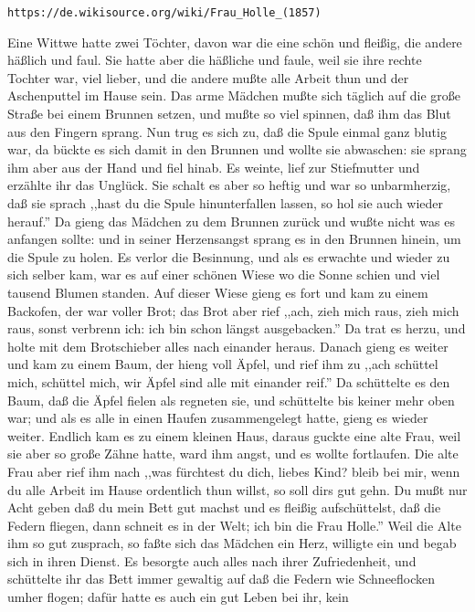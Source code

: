 \documentclass[10pt,a4paper]{article}
\begin{document}
\verb+https://de.wikisource.org/wiki/Frau_Holle_(1857)+

\vskip 4pt
Eine Wittwe hatte zwei Töchter, davon war die eine schön und fleißig, die andere
häßlich und faul. Sie hatte aber die häßliche und faule, weil sie ihre rechte
Tochter war, viel lieber, und die andere mußte alle Arbeit thun und der
Aschenputtel im Hause sein. Das arme Mädchen mußte sich täglich auf die große
Straße bei einem Brunnen setzen, und mußte so viel spinnen, daß ihm das Blut aus
den Fingern sprang. Nun trug es sich zu, daß die Spule einmal ganz blutig war,
da bückte es sich damit in den Brunnen und wollte sie abwaschen: sie sprang ihm
aber aus der Hand und fiel hinab. Es weinte, lief zur Stiefmutter und erzählte
ihr das Unglück. Sie schalt es aber so heftig und war so unbarmherzig, daß sie
sprach ,,hast du die Spule hinunterfallen lassen, so hol sie auch wieder herauf.''
Da gieng das Mädchen zu dem Brunnen zurück und wußte nicht was es anfangen
sollte: und in seiner Herzensangst sprang es in den Brunnen hinein, um die Spule
zu holen. Es verlor die Besinnung, und als es erwachte und wieder zu sich selber
kam, war es auf einer schönen Wiese wo die Sonne schien und viel tausend Blumen
standen. Auf dieser Wiese gieng es fort und kam zu einem Backofen, der war
voller Brot; das Brot aber rief ,,ach, zieh mich raus, zieh mich raus, sonst
verbrenn ich: ich bin schon längst ausgebacken.'' Da trat es herzu, und holte
mit dem Brotschieber alles nach einander heraus. Danach gieng es weiter und kam
zu einem Baum, der hieng voll Äpfel, und rief ihm zu ,,ach schüttel mich,
schüttel mich, wir Äpfel sind alle mit einander reif.'' Da schüttelte es den
Baum, daß die Äpfel fielen als regneten sie, und schüttelte bis keiner mehr oben
war; und als es alle in einen Haufen zusammengelegt hatte, gieng es wieder
weiter. Endlich kam es zu einem kleinen Haus, daraus guckte eine alte Frau,
weil sie aber so große Zähne hatte, ward ihm angst, und es wollte fortlaufen.
Die alte Frau aber rief ihm nach ,,was fürchtest du dich, liebes Kind? bleib bei
mir, wenn du alle Arbeit im Hause ordentlich thun willst, so soll dirs gut gehn.
Du mußt nur Acht geben daß du mein Bett gut machst und es fleißig aufschüttelst,
daß die Federn fliegen, dann schneit es in der Welt; ich bin die Frau Holle.''
Weil die Alte ihm so gut zusprach, so faßte sich das Mädchen ein Herz, willigte
ein und begab sich in ihren Dienst. Es besorgte auch alles nach ihrer
Zufriedenheit, und schüttelte ihr das Bett immer gewaltig auf daß die Federn wie
Schneeflocken umher flogen; dafür hatte es auch ein gut Leben bei ihr, kein
\end{document}
